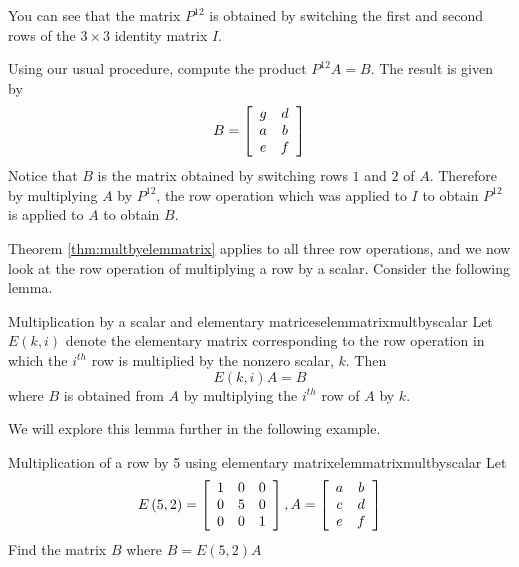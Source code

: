 \begin{solution}
You can see that the matrix $P^{12}$ is obtained by switching the first and second rows of the $3 \times 3$ identity matrix $I$.

Using our usual procedure, compute the product $P^{12}A = B$. The result is given by
\begin{equation*}
B =\left[
\begin{array}{cc}
g & d \\
a & b \\
e & f
\end{array}
\right]
\end{equation*}
Notice that $B$ is the matrix obtained by switching rows $1$ and $2$ of $A$. Therefore by  multiplying 
$A$ by $P^{12}$, the row operation which was applied to $I$ to obtain $P^{12}$ is applied to $A$ to obtain $B$. 
\end{solution}

Theorem \ref{thm:multbyelemmatrix} applies to all three row operations, and we now 
look at the row operation of multiplying a row by a scalar.  Consider the following lemma.

\begin{lemma}{Multiplication by a scalar and elementary matrices}{elemmatrixmultbyscalar}
Let $E\left( k,i\right) $ denote the elementary matrix
corresponding to the row operation in which the $i^{th}$ row is multiplied
by the nonzero scalar, $k.$  Then
\begin{equation*}
E\left( k,i\right) A=B
\end{equation*}
where $B$ is obtained from $A$ by multiplying the $i^{th}$ row of $A$ by $k$.
\end{lemma}

We will explore this lemma further in the following example.

\begin{example}{Multiplication of a row by 5 using elementary matrix}{elemmatrixmultbyscalar}
Let
\begin{equation*}
E \left(5, 2\right) = \left[
\begin{array}{rrr}
1 & 0 & 0 \\
0 & 5 & 0 \\
0 & 0 & 1
\end{array}
\right], A =  \left[
\begin{array}{cc}
a & b \\
c & d \\
e & f
\end{array}
\right]
\end{equation*}
Find the matrix $B$ where $B = E \left(5, 2\right)A$
\end{example}

